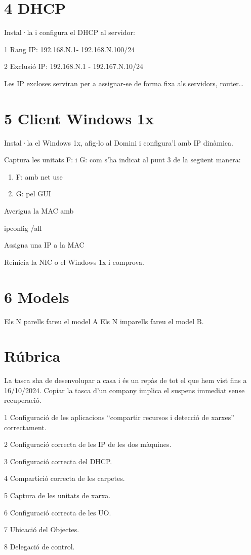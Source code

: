 \documentclass[
  a4paper,
]{article}
\newenvironment{Shaded}{\begin{snugshade}}{\end{snugshade}}
\newcommand{\AttributeTok}[1]{\textcolor[rgb]{0.13,0.29,0.53}{#1}}
\newcommand{\NormalTok}[1]{#1}
\begin{document}
\section{4 DHCP}\label{dhcp}

Instal·la i configura el DHCP al servidor:

1 Rang IP: 192.168.N.1- 192.168.N.100/24

2 Exclusió IP: 192.168.N.1 - 192.167.N.10/24

Les IP excloses serviran per a assignar-se de forma fixa als servidors,
router\ldots{}

\section{5 Client Windows 1x}\label{client-windows-1x}

Instal·la el Windows 1x, afig-lo al Domini i configura'l amb IP
dinàmica.

Captura les unitats F: i G: com s'ha indicat al punt 3 de la següent
manera:

\begin{enumerate}
\def\labelenumi{\arabic{enumi}.}
\item
  F: amb net use
\item
  G: pel GUI
\end{enumerate}

Averigua la MAC amb

\begin{Shaded}
\begin{Highlighting}[]

\NormalTok{ipconfig }\AttributeTok{/all}
\end{Highlighting}
\end{Shaded}

Assigna una IP a la MAC

Reinicia la NIC o el Windows 1x i comprova.

\section{6 Models}\label{models}

Els N parells fareu el model A Els N imparells fareu el model B.

\section{Rúbrica}\label{ruxfabrica}

La tasca sha de desenvolupar a casa i és un repàs de tot el que hem vist
fins a 16/10/2024. Copiar la tasca d'un company implica el suspens
immediat sense recuperació.

1 Configuració de les aplicacions ``compartir recursos i detecció de
xarxes'' correctament.

2 Configuració correcta de les IP de les dos màquines.

3 Configuració correcta del DHCP.

4 Compartició correcta de les carpetes.

5 Captura de les unitats de xarxa.

6 Configuració correcta de les UO.

7 Ubicació del Objectes.

8 Delegació de control.
\end{document}
